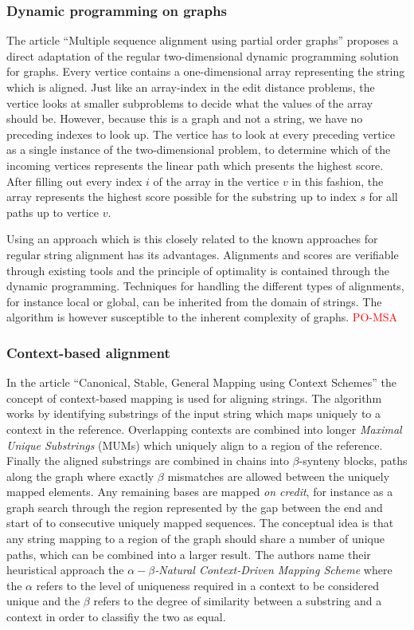 \documentclass[thesis.tex]{subfiles}
\begin{document}
\subsubsection{Dynamic programming on graphs}
The article ``Multiple sequence alignment using partial order graphs'' proposes a direct adaptation of the regular two-dimensional dynamic programming solution for graphs. Every vertice contains a one-dimensional array representing the string which is aligned. Just like an array-index in the edit distance problems, the vertice looks at smaller subproblems to decide what the values of the array should be. However, because this is a graph and not a string, we have no preceding indexes to look up. The vertice has to look at every preceding vertice as a single instance of the two-dimensional problem, to determine which of the incoming vertices represents the linear path which presents the highest score. After filling out every index $i$ of the array in the vertice $v$ in this fashion, the array represents the highest score possible for the substring up to index $s$ for all paths up to vertice $v$.\\
\par\noindent
Using an approach which is this closely related to the known approaches for regular string alignment has its advantages. Alignments and scores are verifiable through existing tools and the principle of optimality is contained through the dynamic programming. Techniques for handling the different types of alignments, for instance local or global, can be inherited from the domain of strings. The algorithm is however susceptible to the inherent complexity of graphs.
\label{sec:po_msa}
\textcolor{red}{PO-MSA}
\subsubsection{Context-based alignment}
In the article ``Canonical, Stable, General Mapping using Context Schemes''\cite{canonical_stable_general_mapping_using_context_schemes} the concept of context-based mapping is used for aligning strings. The algorithm works by identifying substrings of the input string which maps uniquely to a context in the reference. Overlapping contexts are combined into longer \textit{Maximal Unique Substrings} (MUMs) which uniquely align to a region of the reference. Finally the aligned substrings are combined in chains into $\beta$-synteny blocks, paths along the graph where exactly $\beta$ mismatches are allowed between the uniquely mapped elements. Any remaining bases are mapped \textit{on credit}, for instance as a graph search through the region represented by the gap between the end and start of to consecutive uniquely mapped sequences. The conceptual idea is that any string mapping to a region of the graph should share a number of unique paths, which can be combined into a larger result. The authors name their heuristical approach the \textit{$\alpha-\beta$-Natural Context-Driven Mapping Scheme} where the $\alpha$ refers to the level of uniqueness required in a context to be considered unique and the $\beta$ refers to the degree of similarity between a substring and a context in order to classifiy the two as equal.
\end{document}
